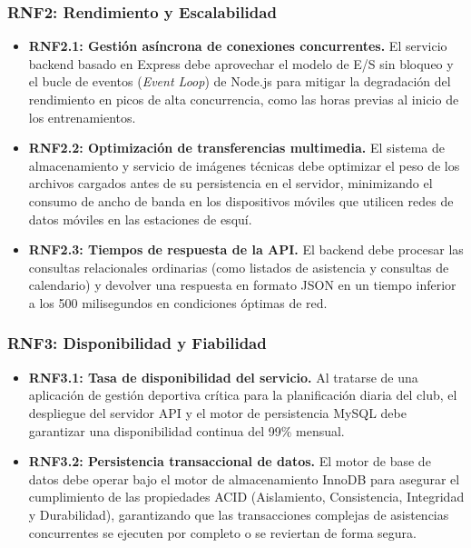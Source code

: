         \subsubsection*{RNF2: Rendimiento y Escalabilidad}
        \begin{itemize}
            \item \textbf{RNF2.1: Gestión asíncrona de conexiones concurrentes.} El servicio backend basado en Express debe aprovechar el modelo de E/S sin bloqueo y el bucle de eventos (\textit{Event Loop}) de Node.js para mitigar la degradación del rendimiento en picos de alta concurrencia, como las horas previas al inicio de los entrenamientos.
            \item \textbf{RNF2.2: Optimización de transferencias multimedia.} El sistema de almacenamiento y servicio de imágenes técnicas debe optimizar el peso de los archivos cargados antes de su persistencia en el servidor, minimizando el consumo de ancho de banda en los dispositivos móviles que utilicen redes de datos móviles en las estaciones de esquí.
            \item \textbf{RNF2.3: Tiempos de respuesta de la API.} El backend debe procesar las consultas relacionales ordinarias (como listados de asistencia y consultas de calendario) y devolver una respuesta en formato JSON en un tiempo inferior a los 500 milisegundos en condiciones óptimas de red.
        \end{itemize}

        \subsubsection*{RNF3: Disponibilidad y Fiabilidad}
        \begin{itemize}
            \item \textbf{RNF3.1: Tasa de disponibilidad del servicio.} Al tratarse de una aplicación de gestión deportiva crítica para la planificación diaria del club, el despliegue del servidor API y el motor de persistencia MySQL debe garantizar una disponibilidad continua del 99\% mensual.
            \item \textbf{RNF3.2: Persistencia transaccional de datos.} El motor de base de datos debe operar bajo el motor de almacenamiento InnoDB para asegurar el cumplimiento de las propiedades ACID (Aislamiento, Consistencia, Integridad y Durabilidad), garantizando que las transacciones complejas de asistencias concurrentes se ejecuten por completo o se reviertan de forma segura.
        \end{itemize}

